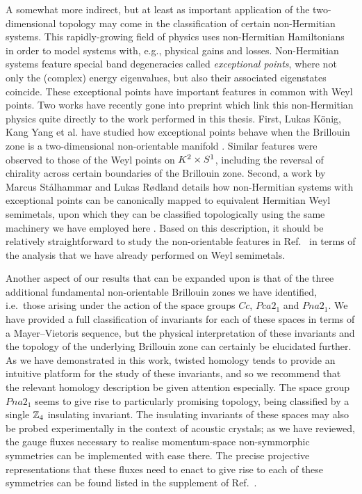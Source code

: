 A somewhat more indirect, but at least as important application of the two-dimensional topology may come in the classification of certain non-Hermitian systems. This rapidly-growing field of physics uses non-Hermitian Hamiltonians in order to model systems with, e.g., physical gains and losses. Non-Hermitian systems feature special band degeneracies called \emph{exceptional points}, where not only the (complex) energy eigenvalues, but also their associated eigenstates coincide. These exceptional points have important features in common with Weyl points. Two works have recently gone into preprint which link this non-Hermitian physics quite directly to the work performed in this thesis. First, Lukas König, Kang Yang et al. have studied how exceptional points behave when the Brillouin zone is a two-dimensional non-orientable manifold \cite{KönigYang_nonorientable-EPs}. Similar features were observed to those of the Weyl points on $K^2\times S^1$, including the reversal of chirality across certain boundaries of the Brillouin zone. Second, a work by Marcus Stålhammar and Lukas Rødland details how non-Hermitian systems with exceptional points can be canonically mapped to equivalent Hermitian Weyl semimetals, upon which they can be classified topologically using the same machinery we have employed here \cite{Staalhammar_EPn-cohomology}. Based on this description, it should be relatively straightforward to study the non-orientable features in Ref.~\cite{KönigYang_nonorientable-EPs} in terms of the analysis that we have already performed on Weyl semimetals.

Another aspect of our results that can be expanded upon is that of the three additional fundamental non-orientable Brillouin zones we have identified, i.e.\ those arising under the action of the space groups $Cc$, $Pca2_1$ and $Pna2_1$. We have provided a full classification of invariants for each of these spaces in terms of a Mayer--Vietoris sequence, but the physical interpretation of these invariants and the topology of the underlying Brillouin zone can certainly be elucidated further. As we have demonstrated in this work, twisted homology tends to provide an intuitive platform for the study of these invariants, and so we recommend that the relevant homology description be given attention especially. The space group $Pna2_1$ seems to give rise to particularly promising topology, being classified by a single $\mathbb{Z}_4$ insulating invariant. The insulating invariants of these spaces may also be probed experimentally in the context of acoustic crystals; as we have reviewed, the gauge fluxes necessary to realise momentum-space non-symmorphic symmetries can be implemented with ease there. The precise projective representations that these fluxes need to enact to give rise to each of these symmetries can be found listed in the supplement of Ref.~\cite{Zhang_nonsymmorphic}.


